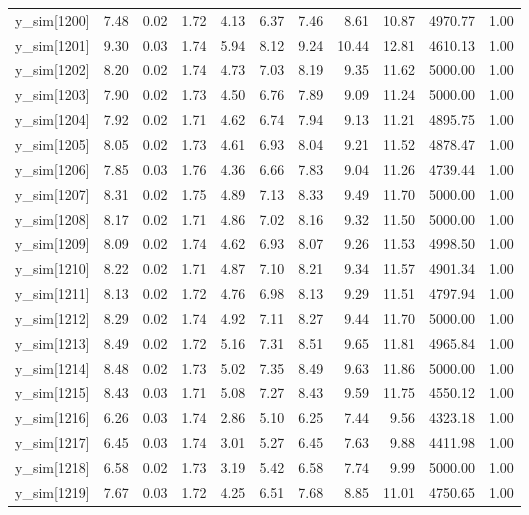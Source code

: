 \begin{table}[ht]
\begin{tabular}{rrrrrrrrrrr}
  y\_sim[1200] & 7.48 & 0.02 & 1.72 & 4.13 & 6.37 & 7.46 & 8.61 & 10.87 & 4970.77 & 1.00 \\ 
  y\_sim[1201] & 9.30 & 0.03 & 1.74 & 5.94 & 8.12 & 9.24 & 10.44 & 12.81 & 4610.13 & 1.00 \\ 
  y\_sim[1202] & 8.20 & 0.02 & 1.74 & 4.73 & 7.03 & 8.19 & 9.35 & 11.62 & 5000.00 & 1.00 \\ 
  y\_sim[1203] & 7.90 & 0.02 & 1.73 & 4.50 & 6.76 & 7.89 & 9.09 & 11.24 & 5000.00 & 1.00 \\ 
  y\_sim[1204] & 7.92 & 0.02 & 1.71 & 4.62 & 6.74 & 7.94 & 9.13 & 11.21 & 4895.75 & 1.00 \\ 
  y\_sim[1205] & 8.05 & 0.02 & 1.73 & 4.61 & 6.93 & 8.04 & 9.21 & 11.52 & 4878.47 & 1.00 \\ 
  y\_sim[1206] & 7.85 & 0.03 & 1.76 & 4.36 & 6.66 & 7.83 & 9.04 & 11.26 & 4739.44 & 1.00 \\ 
  y\_sim[1207] & 8.31 & 0.02 & 1.75 & 4.89 & 7.13 & 8.33 & 9.49 & 11.70 & 5000.00 & 1.00 \\ 
  y\_sim[1208] & 8.17 & 0.02 & 1.71 & 4.86 & 7.02 & 8.16 & 9.32 & 11.50 & 5000.00 & 1.00 \\ 
  y\_sim[1209] & 8.09 & 0.02 & 1.74 & 4.62 & 6.93 & 8.07 & 9.26 & 11.53 & 4998.50 & 1.00 \\ 
  y\_sim[1210] & 8.22 & 0.02 & 1.71 & 4.87 & 7.10 & 8.21 & 9.34 & 11.57 & 4901.34 & 1.00 \\ 
  y\_sim[1211] & 8.13 & 0.02 & 1.72 & 4.76 & 6.98 & 8.13 & 9.29 & 11.51 & 4797.94 & 1.00 \\ 
  y\_sim[1212] & 8.29 & 0.02 & 1.74 & 4.92 & 7.11 & 8.27 & 9.44 & 11.70 & 5000.00 & 1.00 \\ 
  y\_sim[1213] & 8.49 & 0.02 & 1.72 & 5.16 & 7.31 & 8.51 & 9.65 & 11.81 & 4965.84 & 1.00 \\ 
  y\_sim[1214] & 8.48 & 0.02 & 1.73 & 5.02 & 7.35 & 8.49 & 9.63 & 11.86 & 5000.00 & 1.00 \\ 
  y\_sim[1215] & 8.43 & 0.03 & 1.71 & 5.08 & 7.27 & 8.43 & 9.59 & 11.75 & 4550.12 & 1.00 \\ 
  y\_sim[1216] & 6.26 & 0.03 & 1.74 & 2.86 & 5.10 & 6.25 & 7.44 & 9.56 & 4323.18 & 1.00 \\ 
  y\_sim[1217] & 6.45 & 0.03 & 1.74 & 3.01 & 5.27 & 6.45 & 7.63 & 9.88 & 4411.98 & 1.00 \\ 
  y\_sim[1218] & 6.58 & 0.02 & 1.73 & 3.19 & 5.42 & 6.58 & 7.74 & 9.99 & 5000.00 & 1.00 \\ 
  y\_sim[1219] & 7.67 & 0.03 & 1.72 & 4.25 & 6.51 & 7.68 & 8.85 & 11.01 & 4750.65 & 1.00 \\ 

\end{tabular}
\end{table}
